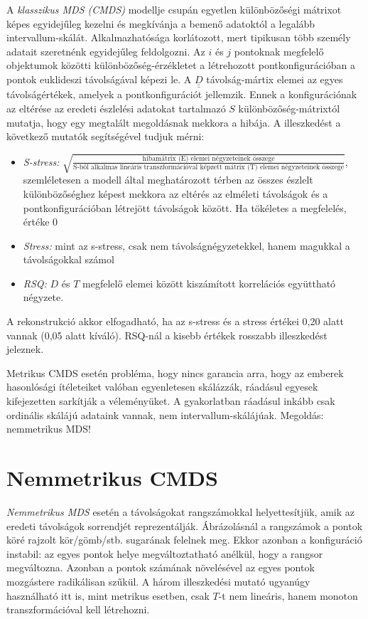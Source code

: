 A \emph{klasszikus MDS (CMDS)} modellje csupán egyetlen különbözőségi mátrixot képes egyidejűleg kezelni és megkívánja a bemenő adatoktól a legalább intervallum-skálát. Alkalmazhatósága korlátozott, mert tipikusan több személy adatait szeretnénk egyidejűleg feldolgozni. Az $i$ és $j$ pontoknak megfelelő objektumok közötti különbözőség-érzékletet a létrehozott pontkonfigurációban a pontok euklideszi távolságával képezi le. A $\underline{\underline{D}}$ távolság-mártix elemei az egyes távolságértékek, amelyek a pontkonfigurációt jellemzik. Ennek a konfigurációnak az eltérése az eredeti észlelési adatokat tartalmazó $S$ különbözőség-mátrixtól mutatja, hogy egy megtalált megoldásnak mekkora a hibája. A illeszkedést a következő mutatók segítségével tudjuk mérni:
\begin{itemize}
\item \emph{S-stress:} $\sqrt{\frac{\text{hibamátrix (E) elemei négyzeteinek összege}}{\text{S-ből alkalmas lineáris transzformációval képzett mátrix (T) elemei négyzeteinek összege}}}$,\\szemléletesen a modell által meghatározott térben az összes észlelt különbözőséghez képest mekkora az eltérés az elméleti távolságok és a pontkonfigurációban létrejött távolságok között. Ha tökéletes a megfelelés, értéke 0
\item \emph{Stress:} mint az s-stress, csak nem távolságnégyzetekkel, hanem magukkal a távolságokkal számol
\item \emph{RSQ:} $D$ és $T$ megfelelő elemei között kiszámított korrelációs együttható négyzete.
\end{itemize}
A rekonstrukció akkor elfogadható, ha az s-stress és a stress értékei 0,20 alatt vannak (0,05 alatt kíváló). RSQ-nál a kisebb értékek rosszabb illeszkedést jeleznek.

Metrikus CMDS esetén probléma, hogy nincs garancia arra, hogy az emberek hasonlósági ítéleteiket valóban egyenletesen skálázzák, ráadásul egyesek kifejezetten sarkítják a véleményüket. A gyakorlatban ráadásul inkább csak ordinális skálájú adataink vannak, nem intervallum-skálájúak. Megoldás: nemmetrikus MDS!

\section{Nemmetrikus CMDS}

\emph{Nemmetrikus MDS} esetén a távolságokat rangszámokkal helyettesítjük, amik az eredeti távolságok sorrendjét reprezentálják. Ábrázolásnál a rangszámok a pontok köré rajzolt kör/gömb/stb. sugarának felelnek meg. Ekkor azonban a konfiguráció instabil: az egyes pontok helye megváltoztatható anélkül, hogy a rangsor megváltozna. Azonban a pontok számának növelésével az egyes pontok mozgástere radikálisan szűkül. A három illeszkedési mutató ugyanúgy használható itt is, mint metrikus esetben, csak $T$-t nem lineáris, hanem monoton transzformációval kell létrehozni.

